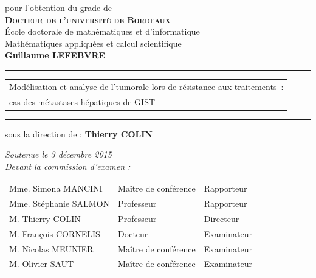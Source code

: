 \documentclass[a4paper,twoside,final]{book} %
\newcounter{hours}\newcounter{minutes}
\newcommand{\printtime}{%
  \setcounter{hours}{\time/60}%
  \setcounter{minutes}{\time-\value{hours}*60}%
  \thehours h\,\nplpadding{2}\numprint{\theminutes}\npnolpadding}
\theoremstyle{definition}
\newcommand{\shortitlefr}{Modélisation et analyse de l'\hetero tumorale lors de résistance aux traitements}
\newcommand{\subtitlefr}{cas des métastases hépatiques de GIST}
\newcommand{\titrefr}{\shortitlefr~: \subtitlefr}
\begin{document}
\begin{titlepage}
\begin{center}
  	\vspace{0.5cm}
   pour l'obtention du grade de\\
   	\vspace{0.5cm}
  \textbf{\textsc{\LARGE Docteur de l'université de Bordeaux}}\\
  	\vspace{0.5cm}
  {\Large École doctorale de mathématiques et d'informatique\\
  	Mathématiques appliquées et calcul scientifique}\\
  \vfill
  \textbf{\Large Guillaume LEFEBVRE}\\
  \vfill
  \hrule \vspace{0.5cm}
  \begin{tabular}{C{12cm}}
  \sc \Large \shortitlefr~: \vspace{1mm}\\ 
  \sc \large \subtitlefr  
  \end{tabular}
  \vspace{0.5cm}\hrule
\vfill
sous la direction de : \textbf{Thierry COLIN}
\end{center}
\vfill
\begin{flushleft}
\textit{Soutenue le 3 décembre 2015}\\ \vspace{5mm}
\textit{Devant la commission d'examen :}
\end{flushleft}
\vspace{-5mm}
\begin{center}\begin{tabular}{p{6cm} p{50mm} l}
 Mme. Simona MANCINI & Maître de conférence & Rapporteur \\
 Mme. Stéphanie SALMON & Professeur & Rapporteur \\
 M. Thierry COLIN & Professeur & Directeur \\
 M. Fran\c cois CORNELIS & Docteur & Examinateur \\
 M. Nicolas MEUNIER & Maître de conférence & Examinateur \\
 M. Olivier SAUT & Maître de conférence & Examinateur\\
\end{tabular}\end{center}
\end{titlepage}

\end{document}
